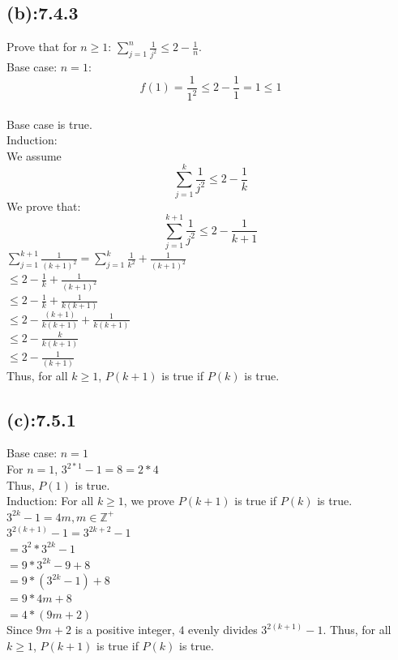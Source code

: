 \documentclass[titlepage]{article}\pagestyle{empty}
\begin{document}
\subsection*{(b):7.4.3}
Prove that for $n \geq 1$: $\sum_{j=1}^{n}\frac{1}{j^2}\le2-\frac{1}{n}$.\\
Base case: $n = 1$:\\
\[f(1)=\frac{1}{1^2}\le2-\frac{1}{1}=1\leq 1\]\\
Base case is true.\\
Induction:\\
We assume \[\sum_{j=1}^{k}\frac{1}{j^2}\le2-\frac{1}{k}\]
We prove that:
\[\sum_{j=1}^{k+1}\frac{1}{j^2}\le2-\frac{1}{k+1}\]
$\sum_{j=1}^{k+1}\frac{1}{(k+1)^2}=\sum_{j=1}^{k}\frac{1}{k^2}+\frac{1}{(k+1)^2}$\\
$\leq2-\frac{1}{k}+\frac{1}{(k+1)^2}$\\
$\leq2-\frac{1}{k}+\frac{1}{k(k+1)}$\\
$\leq2-\frac{(k+1)}{k(k+1)}+\frac{1}{k(k+1)}$\\
$\leq2-\frac{k}{k(k+1)}$\\
$\leq2-\frac{1}{(k+1)}$\\
Thus, for all $k\geq1$, $P(k+1)$ is true if $P(k)$ is true.\\
\subsection*{(c):7.5.1}
Base case: $n=1$\\
For $n=1$, $3^{2*1}-1=8=2*4$\\
Thus, $P(1)$ is true.\\
Induction: For all $k\geq1$, we prove $P(k+1)$ is true if $P(k)$ is true.\\
$3^{2k}-1=4m, m \in \mathbb{Z}^+$\\
$3^{2(k+1)}-1=3^{2k+2}-1$\\
$=3^2*3^{2k}-1$\\
$=9*3^{2k}-9+8$\\
$=9*(3^{2k}-1)+8$\\
$=9*4m+8$\\
$=4*(9m+2)$\\
Since $9m+2$ is a positive integer, $4$ evenly divides $3^{2(k+1)}-1$. Thus, for all $k\geq1$, $P(k+1)$ is true if $P(k)$ is true.
\end{document}
